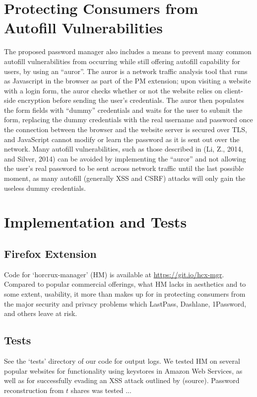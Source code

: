 \documentclass[conference]{IEEEtran}
\begin{document}
\section{Protecting Consumers from Autofill Vulnerabilities}
The proposed password manager also includes a means to prevent many common
autofill vulnerabilities from occurring while still offering autofill capability
for users, by using an ``auror''. The auror is a network traffic analysis tool
that runs as Javascript in the browser as part of the PM extension; upon
visiting a website with a login form, the auror checks whether or not the
website relies on client-side encryption before sending the user's credentials. 
The auror then populates the form fields with ``dummy''
credentials and waits for the user to submit the form, replacing the
dummy credentials with the real username and password once the connection
between the browser and the website server is secured over TLS, and JavaScript
cannot modify or learn the password as it is sent out over the network. Many
autofill vulnerabilities, such as those described in (Li, Z., 2014, and Silver,
2014) can be avoided by implementing the ``auror'' and not allowing the user's
real password to be sent across network traffic until the last possible moment,
as many autofill (generally XSS and CSRF) attacks will only gain the useless
dummy credentials.

\section{Implementation and Tests}
\subsection{Firefox Extension}
Code for `horcrux-manager' (HM) is available at \url{https://git.io/hcx-mgr}.
Compared to popular commercial offerings, what HM lacks in aesthetics and to
some extent, usability, it more than makes up for in protecting consumers from
the major security and privacy problems which LastPass, Dashlane, 1Password, and
others leave at risk.

\subsection{Tests}
See the `tests' directory of our code for output logs. We tested HM on several
popular websites for functionality using keystores in Amazon Web Services, as
well as for successfully evading an XSS attack outlined by (source). Password
reconstruction from $t$ shares was tested ...
\end{document}
